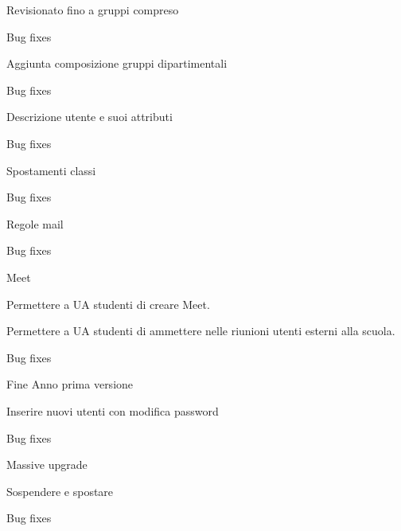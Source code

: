 \begin{changelog}[author=JOHN DOE, sectioncmd=\chapter*]
	\begin{version}[v=1.9.9,
		date=2023-08-25]
		\added
		\item Revisionato fino a gruppi compreso
		\fixed
		\item Bug fixes
	\end{version}
	\begin{version}[v=1.0.6,
		date=2023-08-14]
		\added
		\item Aggiunta composizione gruppi dipartimentali
		\fixed
		\item Bug fixes
	\end{version}
	\begin{version}[v=1.0.5,
		date=2023-08-11]
		\added
		\item Descrizione utente e suoi attributi
		\fixed
		\item Bug fixes
	\end{version}
	\begin{version}[v=1.0.4,
		date=2023-07-25]
		\added
		\item Spostamenti classi
		\fixed
		\item Bug fixes
	\end{version}
	\begin{version}[v=1.0.3,
		date=2023-07-25]
		\added
		\item Regole mail
		\fixed
		\item Bug fixes
	\end{version}
		\begin{version}[v=1.0.2,
		date=2023-07-21]
		\added
		\item Meet
		\item Permettere a  UA studenti di creare Meet.
		\item Permettere a UA studenti di ammettere nelle riunioni utenti esterni alla scuola.
		\fixed
		\item Bug fixes
	\end{version}
	\begin{version}[v=1.0.1,
		date=2023-07-17]
		\added
		\item Fine Anno prima versione
		\item Inserire nuovi utenti con modifica password
		\fixed
		\item Bug fixes
	\end{version}
	\begin{version}[v=1.0.0,
		date=2023-07-15]
		\added
		\item Massive upgrade
		\item Sospendere e spostare
		\fixed
		\item Bug fixes
	\end{version}
	\end{changelog}
	\listoftodos